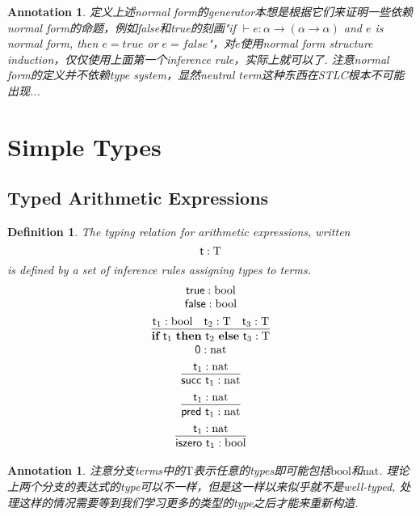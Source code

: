 \documentclass{article}
\theoremstyle{plain}
\newtheorem{definition}[theorem]{Definition}
\newtheorem{annotation}[theorem]{Annotation}
\theoremstyle{nonumberplain}
\newcommand{\termtype}[2]{\ensuremath{#1:#2}}
\newcommand{\term}[1]{\ensuremath\mathsf{#1}}
\newcommand{\true}{\term{true}}
\newcommand{\false}{\term{false}}
\newcommand{\ifelse}[3]{\ensuremath{\textbf{if}~#1~\textbf{then}~#2~\textbf{else}~#3}}
\newcommand{\succt}[1]{\term{succ}~#1}
\newcommand{\pred}[1]{\term{pred}~#1}
\newcommand{\iszero}[1]{\term{iszero}~#1}
\begin{document}
\begin{annotation}
\rm 定义上述normal form的generator本想是根据它们来证明一些依赖normal form的命题，例如false和true的刻画"if $\vdash e:\alpha \to (\alpha \to \alpha)$ and $e$ is normal form, then $e = true$ or $e = false$"，对$e$使用normal form structure induction，仅仅使用上面第一个inference rule，实际上就可以了. 注意normal form的定义并不依赖type system，显然neutral term这种东西在STLC根本不可能出现... 
\end{annotation}


\newpage
\section{Simple Types}

\subsection{Typed Arithmetic Expressions}

\begin{definition}
\rm The typing relation for arithmetic expressions, written
$$
\termtype{\term{t}}{\text{T}}
$$
is defined by a set of inference rules assigning types to terms.
$$
\begin{array}{c}
\termtype{\true}{\text{bool}} \\
\termtype{\false}{\text{bool}} \\[0.5em]
\infer{\termtype{\ifelse{\term{t}_1}{\term{t}_2}{\term{t}_3}}{\text{T}}}{\termtype{\term{t}_1}{\text{bool}} & \termtype{\term{t}_2}{\text{T}} & \termtype{\term{t}_3}{\text{T}}} \\
\termtype{\term{0}}{\text{nat}} \\[0.5em]
\infer{\termtype{\succt{\term{t}_1}}{\text{nat}}} {\termtype{\term{t}_1}{\text{nat}}}\\[0.5em]
\infer{\termtype{\pred{\term{t}_1}}{\text{nat}}} {\termtype{\term{t}_1}{\text{nat}}}\\[0.5em]
\infer{\termtype{\iszero{\term{t}_1}}{\text{bool}}} {\termtype{\term{t}_1}{\text{nat}}}\\
\end{array} 
$$
\end{definition}


\begin{annotation}
\rm 注意分支terms中的$\text{T}$表示任意的types即可能包括$\text{bool}$和$\text{nat}$. 理论上两个分支的表达式的type可以不一样，但是这一样以来似乎就不是well-typed, 处理这样的情况需要等到我们学习更多的类型的type之后才能来重新构造. 
\end{annotation}
\end{document}
